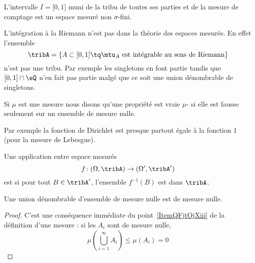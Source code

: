 \begin{example}
    L'intervalle \( I=\mathopen[ 0 , 1 \mathclose]\) muni de la tribu de toutes ses parties et de la mesure de comptage est un espace mesuré non \( \sigma\)-fini.
\end{example}

\begin{example}
    L'intégration à la Riemann n'est pas dans la théorie des espaces mesurés. En effet l'ensemble
    \begin{equation}
        \tribA=\{   A\subset\mathopen[ 0 , 1 \mathclose]\tq   \mtu_A\text{ est intégrable au sens de Riemann}   \}
    \end{equation}
    n'est pas une tribu. Par exemple les singletons en font partie tandis que \( \mathopen[ 0 , 1 \mathclose]\cap \eQ\) n'en fait pas partie malgé que ce soit une union dénombrable de singletons.
\end{example}

\begin{definition}
    Si \( \mu\) est une mesure nous disons qu'une propriété est vraie \( \mu\)- si elle est fausse seulement sur un ensemble de mesure nulle.
\end{definition}

Par exemple la fonction de Dirichlet est presque partout égale à la fonction \( 1\) (pour la mesure de Lebesgue).

\begin{definition}
    Une application entre espace mesurés
    \begin{equation}
        f\colon (\Omega,\tribA)\to (\Omega',\tribA')
    \end{equation}
    est  si pour tout \( B\in\tribA'\), l'ensemble \( f^{-1}(B)\) est dans \( \tribA\).
\end{definition}

\begin{lemma}   \label{LemIDITgAy}
    Une union dénombrable d'ensemble de mesure nulle est de mesure nulle.
\end{lemma}

\begin{proof}
    C'est une conséquence immédiate du point~\ref{ItemQFjtOjXiii} de la définition d'une mesure : si les \( A_i\) sont de mesure nulle,
    \begin{equation}
        \mu\left( \bigcup_{i=1}^{\infty}A_i \right)\leq \mu(A_i)=0
    \end{equation}
\end{proof}

